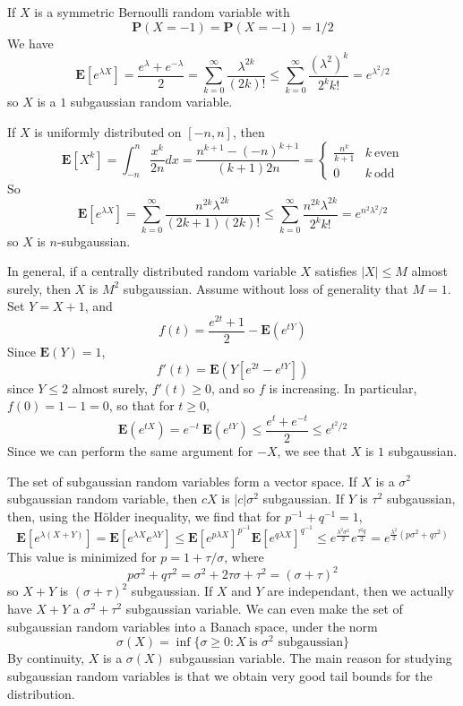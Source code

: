 \begin{example}
    If $X$ is a symmetric Bernoulli random variable with
    \[ \mathbf{P}(X = -1) = \mathbf{P}(X = -1) = 1/2 \]
    We have
    \[ \mathbf{E}[e^{\lambda X}] = \frac{e^\lambda + e^{-\lambda}}{2} = \sum_{k = 0}^\infty \frac{\lambda^{2k}}{(2k)!} \leq \sum_{k = 0}^\infty \frac{(\lambda^2)^k}{2^k k!} = e^{\lambda^2/2} \]
    so $X$ is a $1$ subgaussian random variable.
\end{example}

\begin{example}
    If $X$ is uniformly distributed on $[-n,n]$, then
    \[ \mathbf{E}[X^k] = \int_{-n}^n \frac{x^k}{2n} dx = \frac{n^{k+1} - (-n)^{k+1}}{(k+1)2n} = \begin{cases} \frac{n^k}{k+1} & k\ \text{even} \\ 0 & k\ \text{odd} \end{cases} \]
    So
    \[ \mathbf{E}[e^{\lambda X}] = \sum_{k = 0}^\infty \frac{n^{2k} \lambda^{2k}}{(2k+1)(2k)!} \leq \sum_{k = 0}^\infty \frac{n^{2k} \lambda^{2k}}{2^k k!} = e^{n^2\lambda^2/2} \]
    so $X$ is $n$-subgaussian.
\end{example}

\begin{example}
    In general, if a centrally distributed random variable $X$ satisfies $|X| \leq M$ almost surely, then $X$ is $M^2$ subgaussian. Assume without loss of generality that $M = 1$. Set $Y = X+1$, and
    \[ f(t) = \frac{e^{2t} + 1}{2} - \mathbf{E}(e^{tY}) \]
    Since $\mathbf{E}(Y) = 1$,
    \[ f'(t) = \mathbf{E}(Y[e^{2t} - e^{tY}]) \]
    since $Y \leq 2$ almost surely, $f'(t) \geq 0$, and so $f$ is increasing. In particular, $f(0) = 1 - 1 = 0$, so that for $t \geq 0$,
    \[ \mathbf{E}(e^{tX}) = e^{-t}\ \mathbf{E}(e^{tY}) \leq \frac{e^{t} + e^{-t}}{2} \leq e^{t^2/2} \]
    Since we can perform the same argument for $-X$, we see that $X$ is $1$ subgaussian.
\end{example}

The set of subgaussian random variables form a vector space. If $X$ is a $\sigma^2$ subgaussian random variable, then $cX$ is $|c| \sigma^2$ subgaussian. If $Y$ is $\tau^2$ subgaussian, then, using the H\"{o}lder inequality, we find that for $p^{-1} + q^{-1} = 1$,
%
\[ \mathbf{E}[e^{\lambda(X+Y)}] = \mathbf{E}[e^{\lambda X} e^{\lambda Y}] \leq \mathbf{E}[e^{p \lambda X}]^{p^{-1}} \mathbf{E}[e^{q \lambda X}]^{q^{-1}} \leq e^{\frac{\lambda^2 \sigma^2}{2}} e^{\frac{\tau^2 q}{2}} = e^{\frac{\lambda^2}{2}(p \sigma^2 + q \tau^2)} \]
%
This value is minimized for $p = 1 + \tau/\sigma$, where
%
\[ p \sigma^2 + q \tau^2 = \sigma^2 + 2 \tau \sigma + \tau^2 = (\sigma + \tau)^2 \]
%
so $X + Y$ is $(\sigma + \tau)^2$ subgaussian. If $X$ and $Y$ are independant, then we actually have $X+Y$ a $\sigma^2 + \tau^2$ subgaussian variable. We can even make the set of subgaussian random variables into a Banach space, under the norm
%
\[ \sigma(X) = \inf \{ \sigma \geq 0 : X\ \text{is $\sigma^2$ subgaussian} \} \]
%
By continuity, $X$ is a $\sigma(X)$ subgaussian variable. The main reason for studying subgaussian random variables is that we obtain very good tail bounds for the distribution.

